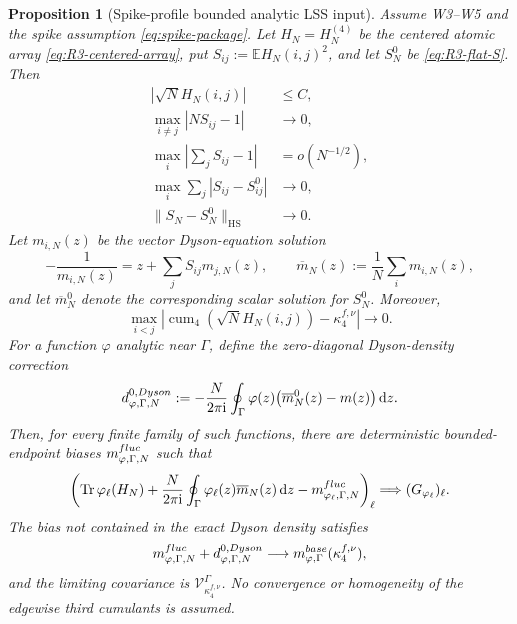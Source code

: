 \documentclass[10pt,a4paper]{amsart}
\newtheorem{proposition}[theorem]{Proposition}
\newcommand{\E}{\mathbb E}
\newcommand{\cum}{\operatorname{cum}}
\newcommand{\Tr}{\operatorname{Tr}}
\newcommand{\ii}{\mathrm i}
\newcommand{\dd}{\mathrm d}
\newcommand{\HS}{\mathrm{HS}}
\newcommand{\norm}[1]{\lVert #1\rVert}
\begin{document}
\begin{proposition}[Spike-profile bounded analytic LSS input]
\label{prop:R3-external-input}
Assume W3--W5 and the spike assumption \eqref{eq:spike-package}.  Let
\(H_N=H_N^{(4)}\) be the centered atomic array
\eqref{eq:R3-centered-array}, put
\(S_{ij}:=\E H_N(i,j)^2\), and let \(S_N^0\) be
\eqref{eq:R3-flat-S}.  Then
\begin{align}
 |\sqrt N H_N(i,j)|&\le C,\label{eq:R3-external-bounded}\\
 \max_{i\ne j}|NS_{ij}-1|&\to0,\label{eq:R3-external-flat}\\
 \max_i\left|\sum_jS_{ij}-1\right|&=o(N^{-1/2}),
 \label{eq:R3-external-strong-row}\\
 \max_i\sum_j|S_{ij}-S_{ij}^0|&\to0,\label{eq:R3-external-row}\\
 \norm{S_N-S_N^0}_{\HS}&\to0.\label{eq:R3-external-HS}
\end{align}
Let \(m_{i,N}(z)\) be the vector Dyson-equation solution
\begin{equation}\label{eq:R3-QVE}
 -\frac1{m_{i,N}(z)}
 =z+\sum_jS_{ij}m_{j,N}(z),
 \qquad
 \overline m_N(z):=\frac1N\sum_i m_{i,N}(z),
\end{equation}
and let \(\overline m_N^0\) denote the corresponding scalar solution for
\(S_N^0\).  Moreover,
\begin{equation}\label{eq:R3-kappa-input}
 \max_{i<j}\left|
 \cum_4(\sqrt N H_N(i,j))-\kappa_4^{f,\nu}
 \right|\to0.
\end{equation}
For a function \(\varphi\) analytic near \(\Gamma\), define the
zero-diagonal Dyson-density correction
\begin{equation}\label{eq:R3-zero-Dyson-definition}
 d_{\varphi,\Gamma,N}^{0,\rm Dyson}
 :=-\frac{N}{2\pi\ii}\oint_\Gamma
 \varphi(z)\bigl(\overline m_N^0(z)-m(z)\bigr)\,\dd z.
\end{equation}
Then, for every finite family of such functions, there are deterministic
bounded-endpoint biases \(m_{\varphi,\Gamma,N}^{\rm fluc}\) such that
\begin{equation}\label{eq:R3-external-CLT}
 \left(
 \Tr\varphi_\ell(H_N)
 +\frac{N}{2\pi\ii}\oint_\Gamma
       \varphi_\ell(z)\overline m_N(z)\,\dd z
 -m_{\varphi_\ell,\Gamma,N}^{\rm fluc}
 \right)_\ell
 \Longrightarrow (G_{\varphi_\ell})_\ell .
\end{equation}
The bias not contained in the exact Dyson density satisfies
\begin{equation}\label{eq:R3-fluc-bias-limit}
 m_{\varphi,\Gamma,N}^{\rm fluc}
 +d_{\varphi,\Gamma,N}^{0,\rm Dyson}
 \longrightarrow m_{\varphi,\Gamma}^{\rm base}(\kappa_4^{f,\nu}),
\end{equation}
and the limiting covariance is
\(\mathcal V_{\kappa_4^{f,\nu}}^\Gamma\).  No convergence or homogeneity of
the edgewise third cumulants is assumed.
\end{proposition}
\end{document}
